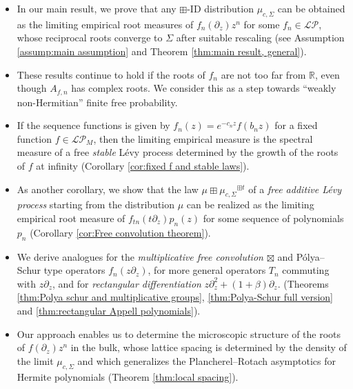 \documentclass[reqno]{amsart}
\newcommand{\1}{\mathbf{1}}
\newcommand{\R}{\mathbb{R}}
\def\R{\mathbb{R}}
\newcommand{\LP}{\mathcal{LP}}
\theoremstyle{plain}
\theoremstyle{definition}
\theoremstyle{remark}
\numberwithin{equation}{section}
\begin{document}
\begin{itemize}
	\item In our main result, we prove that any $\boxplus$-ID distribution $\mu_{c,\Sigma}$ can be obtained as the limiting empirical root measures of $f_n(\partial_z)z^n$ for some $f_n\in\mathcal{LP}$, whose reciprocal roots converge to $\Sigma$ after suitable rescaling (see Assumption \ref{assump:main assumption} and Theorem \ref{thm:main result, general}).
	\item These results continue to hold if the roots of $f_n$ are not too far from $\R$, even though $A_{f,n}$ has complex roots. We consider this as a step towards ``weakly non-Hermitian'' finite free probability.
	\item If the sequence functions is given by $f_n(z)=e^{-c_n{z}}f(b_nz)$ for a fixed function $f\in\LP_M$, then the limiting empirical measure is the spectral measure of a free \emph{stable} L\'evy process determined by the growth of the roots of $f$ at infinity (Corollary \ref{cor:fixed f and stable laws}). %
	\item As another corollary, we show that the law $\mu\boxplus {\mu_{c,\Sigma}}^{\boxplus t}$ of a \emph{free additive L\'evy process} starting from the distribution $\mu$ can be realized as the limiting empirical root measure of $f_{tn}(t\partial_{z})p_n(z)$ for some sequence of polynomials $p_n$ (Corollary \ref{cor:Free convolution theorem}).
	
	\item  We derive analogues for the \emph{multiplicative free convolution $\boxtimes$} and P\'olya--Schur type operators $f_n(z\partial_z)$, for more general operators $T_n$ commuting with $z\partial_z$, and for \emph{rectangular differentiation} $z\partial_{z}^2+(1+\beta)\partial_{z}$. %
	(Theorems \ref{thm:Polya schur and multiplicative groups}, \ref{thm:Polya-Schur full version} and \ref{thm:rectangular Appell polynomials}).
	
	\item  Our approach enables us to determine the microscopic structure of the roots of $f(\partial_{z})z^n$ in the bulk, whose lattice spacing is determined by the density of the limit $\mu_{c,\Sigma}$ and which generalizes the Plancherel–Rotach asymptotics for Hermite polynomials (Theorem \ref{thm:local spacing}).
	

\end{itemize}
\end{document}
